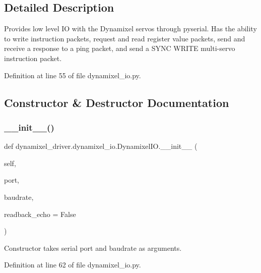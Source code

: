\subsection{Detailed Description}
\begin{DoxyVerb}Provides low level IO with the Dynamixel servos through pyserial. Has the
ability to write instruction packets, request and read register value
packets, send and receive a response to a ping packet, and send a SYNC WRITE
multi-servo instruction packet.
\end{DoxyVerb}
 

Definition at line 55 of file dynamixel\+\_\+io.\+py.



\subsection{Constructor \& Destructor Documentation}
\mbox{\label{classdynamixel__driver_1_1dynamixel__io_1_1_dynamixel_i_o_ab9c6aee22734b7c0a09a4f1e5a03609b}} 
\subsubsection{\texorpdfstring{\+\_\+\+\_\+init\+\_\+\+\_\+()}{\_\_init\_\_()}}
{\footnotesize\ttfamily def dynamixel\+\_\+driver.\+dynamixel\+\_\+io.\+Dynamixel\+I\+O.\+\_\+\+\_\+init\+\_\+\+\_\+ (\begin{DoxyParamCaption}\item[{}]{self,  }\item[{}]{port,  }\item[{}]{baudrate,  }\item[{}]{readback\+\_\+echo = {\ttfamily False} }\end{DoxyParamCaption})}

\begin{DoxyVerb}Constructor takes serial port and baudrate as arguments. \end{DoxyVerb}
 

Definition at line 62 of file dynamixel\+\_\+io.\+py.


